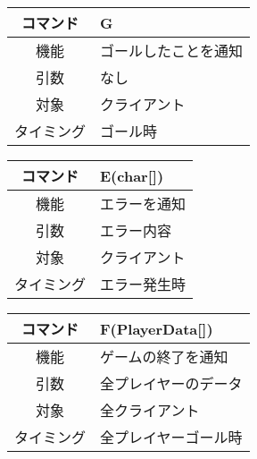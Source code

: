 \documentclass{jarticle}
\begin{document}
\begin{enumerate}
\begin{table}[H]
\begin{center}
\begin{tabular}{|c||p{30em}|}
            \end{tabular}
        \end{center}
    \end{table}
    \begin{table}[H]
        \label{table:command1-2}
        \begin{center}
            \begin{tabular}{|c||p{30em}|}\hline
                コマンド&G\\\hline
                機能&ゴールしたことを通知\\
                引数&なし\\
                対象&クライアント\\
                タイミング&ゴール時\\\hline
            \end{tabular}
        \end{center}
    \end{table}
    \begin{table}[H]
        \label{table:command1-2}
        \begin{center}
            \begin{tabular}{|c||p{30em}|}\hline
                コマンド&E(char[])\\\hline
                機能&エラーを通知\\
                引数&エラー内容\\
                対象&クライアント\\
                タイミング&エラー発生時\\\hline
            \end{tabular}
        \end{center}
    \end{table}
    \begin{table}[H]
        \label{table:command1-2}
        \begin{center}
            \begin{tabular}{|c||p{30em}|}\hline
                コマンド&F(PlayerData[])\\\hline
                機能&ゲームの終了を通知\\
                引数&全プレイヤーのデータ\\
                対象&全クライアント\\
                タイミング&全プレイヤーゴール時\\\hline
            \end{tabular}
        \end{center}

\end{table}
\end{enumerate}
\end{document}

